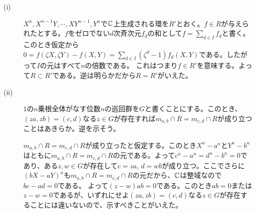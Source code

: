 \newpage

\begin{sol} ${}$
  \begin{description}
    \item[(i)] $X^n, X^{n-1}Y , \cdots , XY^{n-1}, Y^n$で${\mathbb C}$上生成される環を$R'$とおく。$f \in R$が与えられたとする。$f$をゼロでない$d$次斉次元$f_d$の和として$f = \sum_{d \in I} f_d$と書く。このとき仮定から$0 = f(\zeta X,\zeta Y) - f(X,Y) = \sum_{d \in I} (\zeta^d - 1) f_d(X,Y) $である。したがって$I$の元はすべて$n$の倍数である。
    これはつまり$f \in R'$を意味する。よって$R \subset R'$である。逆は明らかだから$R = R'$がいえた。
    \item[(ii)] $1$の$n$乗根全体がなす位数$n$の巡回群を$G$と書くことにする。このとき、$(z a, z b) = (c,d)$なる$z \in G$が存在すれば$m_{a,b} \cap R = m_{c,d} \cap R$が成り立つことはあきらか。逆を示そう。

    $m_{a,b} \cap R = m_{c,d} \cap R$が成り立ったと仮定する。このとき$X^n - a^n$と$Y^n - b^n$はともに$m_{a,b} \cap R = m_{c,d} \cap R$の元である。よって$c^n - a^n = d^n -b^n = 0$であり、ある$z,w \in G$が存在して$c = za$, $d = wb$が成り立つ。ここでさらに$(bX - aY)^n$も$m_{a,b} \cap R = m_{c,d} \cap R$の元だから、${\mathbb C}$は整域なので$bc - ad=0$である。
    よって$(z - w)ab=0$である。このとき$ab=0$または$z-w=0$であるが、いずれにせよ$(z a, z b) = (c,d)$なる$z \in G$が存在することには違いないので、示すべきことがいえた。
  \end{description}
\end{sol}

\newpage


